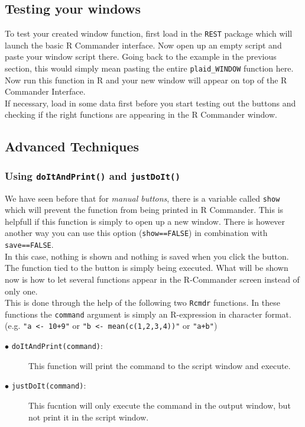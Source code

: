 \documentclass[a4paper]{article}\usepackage[]{graphicx}\usepackage[]{color}
\begin{document}
\subsection{Testing your windows}
To test your created window function, first load in the \texttt{REST} package
which will launch the basic R Commander interface. Now open up an empty script
and paste your window script there. Going back to the example in the previous
section, this would simply mean pasting the entire \verb|plaid_WINDOW| function
here. Now run this function in R and your new window will appear on top
of the R Commander Interface.\\
If necessary, load in some data first before you start testing out the buttons
and checking if the right functions are appearing in the R Commander window.


\subsection{Advanced Techniques}
\subsubsection{Using \texttt{doItAndPrint()} and \texttt{justDoIt()}}
\label{sec:doitandprint}
We have seen before that for {\it manual buttons}, there is a variable called
\verb|show| which will prevent the function from being printed in R Commander.
This is helpfull if this function is simply to open up a new window. There is
however another way you can use this option (\verb|show==FALSE|) in combination
with \verb|save==FALSE|. \\
In this case, nothing is shown and nothing is saved when you click the button.
The function tied to the button is simply being executed. What will be shown now
is how to let several functions appear in the R-Commander screen instead of only
one.\\
This is done through the help of the following two \verb|Rcmdr| functions. In
these functions the \verb|command| argument is simply an R-expression in
character format. (e.g. \verb|"a <- 10+9"| or \verb|"b <- mean(c(1,2,3,4))"| or \verb|"a+b"|)
\begin{description}
  \item[$\bullet$ \texttt{doItAndPrint(command)}:] This function will print the
  command to the script window and execute.
  \item[$\bullet$ \texttt{justDoIt(command)}:] This fucntion will only execute
  the command in the output window, but not print it in the script window.
\end{description}
\end{document}

